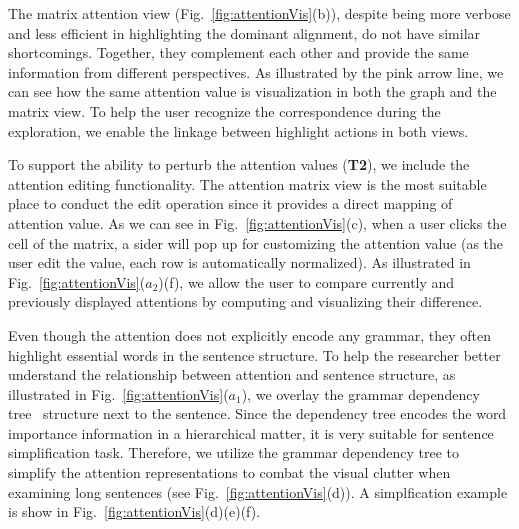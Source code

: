 The matrix attention view (Fig.~\ref{fig:attentionVis}(b)), despite being more verbose and less efficient in highlighting the dominant alignment, do not have similar shortcomings. Together, they complement each other and provide the same information from different perspectives. As illustrated by the pink arrow line, we can see how the same attention value is visualization in both the graph and the matrix view.
To help the user recognize the correspondence during the exploration, we enable the linkage between highlight actions in both views.

To support the ability to perturb the attention values (\textbf{T2}), we include the attention editing functionality. The attention matrix view is the most suitable place to conduct the edit operation since it provides a direct mapping of attention value.
As we can see in Fig.~\ref{fig:attentionVis}(c), when a user clicks the cell of the matrix, a sider will pop up for customizing the attention value (as the user edit the value, each row is automatically normalized).
%
As illustrated in Fig.~\ref{fig:attentionVis}($a_{2}$)(f), we allow the user to compare currently and previously displayed attentions by computing and visualizing their difference.


Even though the attention does not explicitly encode any grammar, they often highlight essential words in the sentence structure.
%
To help the researcher better understand the relationship between attention and sentence structure, as illustrated in Fig.~\ref{fig:attentionVis}($a_{1}$), we overlay the grammar dependency tree~\cite{Nivre2005} structure next to the sentence.
%
Since the dependency tree encodes the word importance information in a hierarchical matter, it is very suitable for sentence simplification task.
Therefore, we utilize the grammar dependency tree to simplify the attention representations to combat the visual clutter when examining long sentences (see Fig.~\ref{fig:attentionVis}(d)).
A simplfication example is show in  Fig.~\ref{fig:attentionVis}(d)(e)(f).




